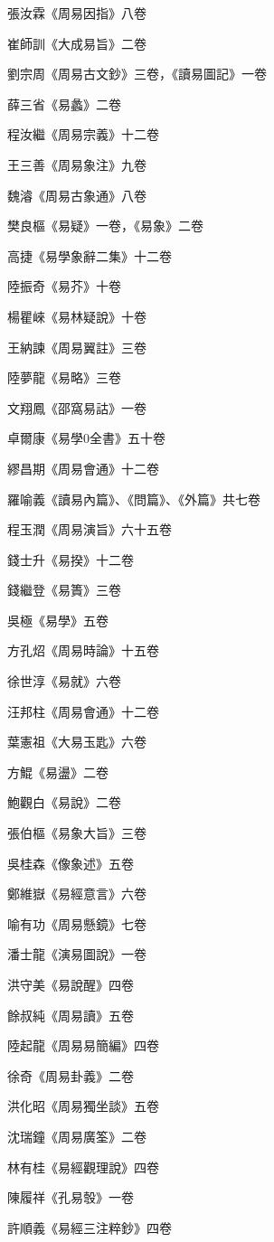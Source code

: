 張汝霖《周易因指》八卷

崔師訓《大成易旨》二卷

劉宗周《周易古文鈔》三卷，《讀易圖記》一卷

薛三省《易蠡》二卷

程汝繼《周易宗義》十二卷

王三善《周易象注》九卷

魏濬《周易古象通》八卷

樊良樞《易疑》一卷，《易象》二卷

高捷《易學象辭二集》十二卷

陸振奇《易芥》十卷

楊瞿崍《易林疑說》十卷

王納諫《周易翼註》三卷

陸夢龍《易略》三卷

文翔鳳《邵窩易詁》一卷

卓爾康《易學0全書》五十卷

繆昌期《周易會通》十二卷

羅喻義《讀易內篇》、《問篇》、《外篇》共七卷

程玉潤《周易演旨》六十五卷

錢士升《易揆》十二卷

錢繼登《易簣》三卷

吳極《易學》五卷

方孔炤《周易時論》十五卷

徐世淳《易就》六卷

汪邦柱《周易會通》十二卷

葉憲祖《大易玉匙》六卷

方鯤《易盪》二卷

鮑觀白《易說》二卷

張伯樞《易象大旨》三卷

吳桂森《像象述》五卷

鄭維嶽《易經意言》六卷

喻有功《周易懸鏡》七卷

潘士龍《演易圖說》一卷

洪守美《易說醒》四卷

餘叔純《周易讀》五卷

陸起龍《周易易簡編》四卷

徐奇《周易卦義》二卷

洪化昭《周易獨坐談》五卷

沈瑞鐘《周易廣筌》二卷

林有桂《易經觀理說》四卷

陳履祥《孔易彀》一卷

許順義《易經三注粹鈔》四卷

